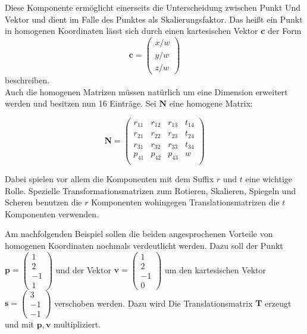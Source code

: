 Diese Komponente 
ermöglicht einerseits die Unterscheidung zwischen Punkt Und Vektor und dient im Falle des Punktes als
Skalierungsfaktor. Das heißt ein Punkt in homogenen Koordinaten lässt sich durch einen kartesischen Vektor
$\mathbf{c}$ der Form
\begin{equation*}
   \mathbf{c} = \begin{pmatrix} x/w \\ y/w \\ z/w   \end{pmatrix}
\end{equation*}
beschreiben.\\

Auch die homogenen Matrizen müssen natürlich um eine Dimension erweitert werden und besitzen nun 16 Einträge.
Sei $\mathbf{N}$ eine homogene Matrix:

\begin{equation*}
    \mathbf{N} = \begin{pmatrix}
        r_{11} & r_{12} & r_{13} & t_{14}\\
        r_{21} & r_{22} & r_{23} & t_{24}\\
        r_{31} & r_{32} & r_{33} & t_{34}\\
        p_{41} & p_{42} & p_{43} & w\\
    \end{pmatrix}
\end{equation*}

Dabei spielen vor allem die Komponenten mit dem Suffix $r$ und $t$ eine wichtige Rolle. Spezielle 
Transformationsmatrizen zum Rotieren, Skalieren, Spiegeln und Scheren benutzen die $r$ Komponenten wohingegen
Translationsmatrizen die $t$ Komponenten verwenden.

Am nachfolgenden Beispiel sollen die beiden angesprochenen Vorteile von homogenen Koordinaten nochmals verdeutlicht werden. Dazu soll der Punkt $\mathbf{p} = \begin{pmatrix} 1 \\ 2 \\ -1 \\ 1 \end{pmatrix}$ und der 
Vektor $\mathbf{v} = \begin{pmatrix} 1 \\ 2 \\ -1 \\ 0 \end{pmatrix}$ um den kartesischen Vektor
$\mathbf{s} = \begin{pmatrix} 3 \\ -1 \\ -1 \end{pmatrix}$ verschoben werden. Dazu wird Die Translationsmatrix
$\mathbf{T}$ erzeugt und mit $\mathbf{p,v}$ multipliziert.

